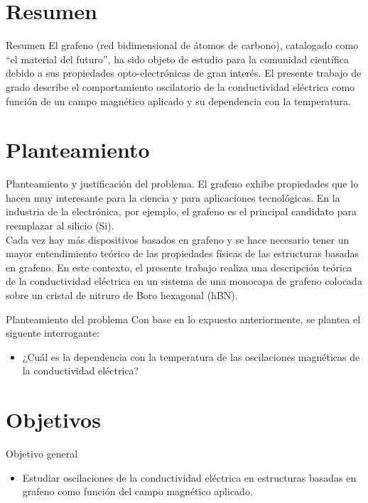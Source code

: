 \section{Resumen}
		\begin{frame}{Resumen}
		\justifying
			El grafeno (red bidimensional de átomos de carbono), catalogado como “el material del futuro”, ha sido objeto de estudio para la comunidad cient\'ifica debido a sus propiedades opto-electrónicas de gran inter\'es.
			El presente trabajo de grado describe el comportamiento oscilatorio de la conductividad el\'ectrica como funci\'on de un campo magnético aplicado
			y su dependencia con la temperatura.
		\end{frame}
	
	\section{Planteamiento}
		\begin{frame}{Planteamiento y justificación del problema.}
			\justifying
			El grafeno exhibe propiedades que lo hacen muy interesante para la ciencia y para aplicaciones tecnológicas. En la industria de la electrónica, por ejemplo, el grafeno es el principal candidato para reemplazar al silicio (Si).\\
			Cada vez hay más dispositivos basados en grafeno y se hace necesario tener un mayor entendimiento teórico de las propiedades físicas de las estructuras basadas en grafeno.
			En este contexto, el presente trabajo realiza una descripción teórica de la conductividad eléctrica en un sistema de una monocapa de grafeno colocada sobre un cristal de nitruro de Boro hexagonal (hBN).	
		\end{frame}
		
		\begin{frame}{Planteamiento del problema}
			\justifying
			Con base en lo expuesto anteriormente, se plantea el siguente interrogante:
			\begin{itemize}
				\item ¿Cuál es la dependencia con la temperatura de las oscilaciones magnéticas de la conductividad eléctrica?
			\end{itemize}
		\end{frame}
	
	
	\section{Objetivos}
		\begin{frame}{Objetivo general}
			\justifying
			\begin{itemize}
    		\item Estudiar oscilaciones de la conductividad eléctrica en estructuras basadas en grafeno como función del campo magnético aplicado.
				\end{itemize}
		\end{frame}

